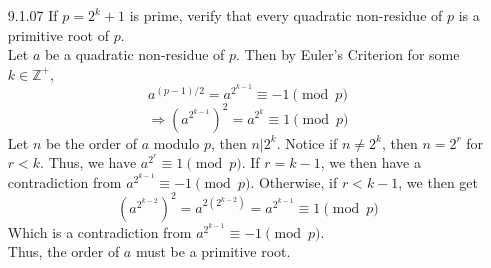 \documentclass[12pt]{article}
\newcommand{\Z}{\mathds{Z}}
\begin{document}
\begin{enumerate}
	\item[9.1.07] If $ p=2^k+1 $ is prime, verify that every quadratic non-residue of $ p $ is a primitive root of $ p $.\\
	Let $ a $ be a quadratic non-residue of $ p $. Then by Euler's Criterion for some $ k\in \Z^+ $,
		\[a^{(p-1)/2}=a^{2^{k-1}}\equiv-1 \pmod p \]
		\[\Rightarrow (a^{2^{k-1}})^2=a^{2^k}\equiv 1 \pmod p \]
		Let $ n $ be the order of $ a $ modulo $ p $, then $ n|2^k $. Notice if $ n \not= 2^k $, then $ n=2^r $ for $ r<k $. Thus, we have $ a^{2^r} \equiv 1 \pmod p$. If $ r=k-1 $, we then have a contradiction from $ a^{2^{k-1}}\equiv-1 \pmod p $. Otherwise, if $ r < k-1 $, we then get 
		\[(a^{2^{k-2}})^2=a^{2(2^{k-2})}=a^{2^{k-1}}\equiv 1\pmod p\]
		Which is a contradiction from  $ a^{2^{k-1}}\equiv-1 \pmod p $.\\
		Thus, the order of $ a $ must be a primitive root.
\end{enumerate}
\end{document}
